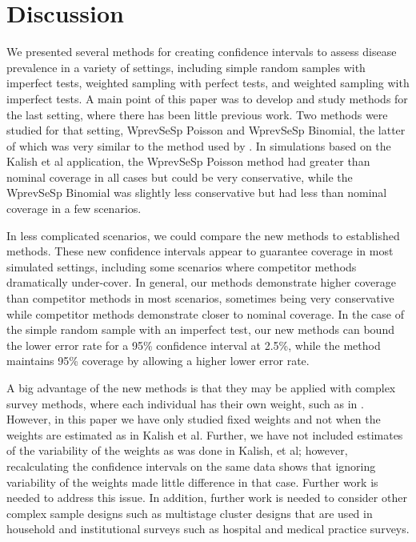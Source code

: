 \pagebreak

\section{Discussion}

We presented several methods for creating confidence intervals to assess disease prevalence in a variety of settings, including simple random samples with imperfect tests, weighted sampling with perfect tests, and weighted sampling with imperfect tests.
A main point of this paper was to develop and study methods for the last setting, where there has been little previous work.
Two methods were studied for that setting, WprevSeSp Poisson and WprevSeSp Binomial, the latter of which was very similar to the method used by \citet{Kali:2021}.
In simulations based on the Kalish et al application, the WprevSeSp Poisson method had greater than nominal coverage in all cases but could be very conservative, while the WprevSeSp Binomial was slightly less conservative but had less than nominal coverage in a few scenarios.

In less complicated scenarios, we could compare the new methods to established methods.
These new confidence intervals appear to guarantee coverage in most simulated settings, including some scenarios where competitor methods dramatically under-cover.
In general, our methods demonstrate higher coverage than competitor methods in most scenarios, sometimes being very conservative while competitor methods demonstrate closer to nominal coverage.
In the case of the simple random sample with an imperfect test, our new methods can bound the lower error rate for a 95\% confidence interval at 2.5\%, while the \citet{Lang:2014} method maintains 95\% coverage by allowing a higher lower error rate.

A big advantage of the new methods is that they may be applied with complex survey methods, where each individual has their own weight, such as in \citep{Kali:2021}.
However, in this paper we have only studied fixed weights and not when the weights are estimated as in Kalish et al.
Further, we have not included estimates of the variability of the weights as was done in Kalish, et al; however, recalculating the confidence intervals on the same data shows that ignoring variability of the weights made little difference in that case.
Further work is needed to address this issue. In addition, further work is needed to consider other complex sample designs such as multistage cluster designs that are used in household and institutional surveys such as hospital and medical practice surveys.

